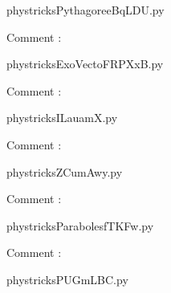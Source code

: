     \newcommand{\CaptionFigPythagoreeBqLDU}{<+Type your caption here+>}
    \begin{center}
        
    \end{center}
    phystricksPythagoreeBqLDU.py

    Comment : 

    \clearpage
    


    \newcommand{\CaptionFigExoVectoFRPXxB}{<+Type your caption here+>}
    \begin{center}
        
    \end{center}
    phystricksExoVectoFRPXxB.py

    Comment : 

    \clearpage
    


    \newcommand{\CaptionFigILauamX}{<+Type your caption here+>}
    \begin{center}
        
    \end{center}
    phystricksILauamX.py

    Comment : 

    \clearpage
    


    \newcommand{\CaptionFigZCumAwy}{<+Type your caption here+>}
    \begin{center}
        
    \end{center}
    phystricksZCumAwy.py

    Comment : 

    \clearpage
    


    \newcommand{\CaptionFigParabolesfTKFw}{<+Type your caption here+>}
    \begin{center}
        
    \end{center}
    phystricksParabolesfTKFw.py

    Comment : 

    \clearpage
    


    \newcommand{\CaptionFigPUGmLBC}{<+Type your caption here+>}
    \begin{center}
        
    \end{center}
    phystricksPUGmLBC.py

